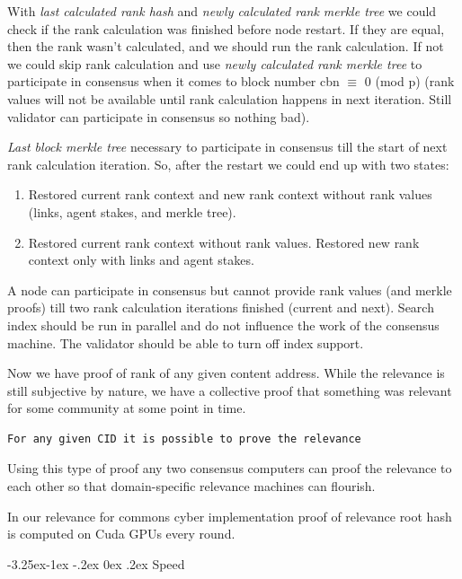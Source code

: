 \documentclass[8pt,oneside]{amsart}
\makeatletter
\newcommand{\linkgreen}[2]{\href{#1}{\color{green}{#2}}}
\renewcommand\subsection{\@startsection{subsection}{2}{\z@}%
                                     {-3.25ex\@plus -1ex \@minus -.2ex}%
                                     {0ex \@plus .2ex}%
                                     {\play\Large}}%
\newcommand{\titleSection}[1]{\subsection{#1}}
\newcommand{\code}[1]{{\PlayBold #1}}
\makeatother
\begin{document}
With \textit{last calculated rank hash} and \textit{newly calculated rank merkle tree} we could check if the rank
calculation was finished before node restart. If they are equal, then the rank wasn't calculated, and we should run the rank calculation.
 If not we could skip rank calculation and use \textit{newly calculated rank merkle tree} to participate in consensus when it comes to block number \code{cbn $\equiv$ 0 (mod p)} (rank values will not be available until rank calculation happens in next iteration. Still validator can participate in consensus so nothing bad).

\textit{Last block merkle tree} necessary to participate in consensus till the start of next rank calculation iteration. So, after the restart we could end up with two states:

\begin{enumerate}
\item Restored current rank context and new rank context without rank values (links, agent stakes, and merkle tree).
\item Restored current rank context without rank values. Restored new rank context only with links and agent stakes.
\end{enumerate}

A node can participate in consensus but cannot provide rank values (and merkle proofs) till two rank calculation iterations finished (current and next). Search index should be run in parallel and do not influence the work of the consensus machine. The validator should be able to turn off index support.

Now we have proof of rank of any given content address. While the relevance is still subjective by nature, we have a collective proof that something was relevant for some community at some point in time.

\begin{lstlisting}
For any given CID it is possible to prove the relevance
\end{lstlisting}

Using this type of proof any two \linkgreen{https://ipfs.io/ipfs/QmdCeixQUHBjGnKfwbB1dxf4X8xnadL8xWmmEnQah5n7x2}{IBC compatible} consensus computers can proof the relevance to each other so that domain-specific relevance machines can flourish.

In our relevance for commons \code{cyber} implementation proof of relevance root hash is computed on Cuda GPUs every round.

\titleSection{Speed}\label{speed-performance}
\end{document}
